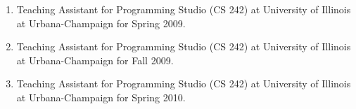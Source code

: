 \begin{enumerate}
\item Teaching Assistant for Programming Studio (CS 242) at University
  of Illinois at Urbana-Champaign for Spring 2009.
\item Teaching Assistant for Programming Studio (CS 242) at University
  of Illinois at Urbana-Champaign for Fall 2009.
\item Teaching Assistant for Programming Studio (CS 242) at University
  of Illinois at Urbana-Champaign for Spring 2010.
\end{enumerate}


